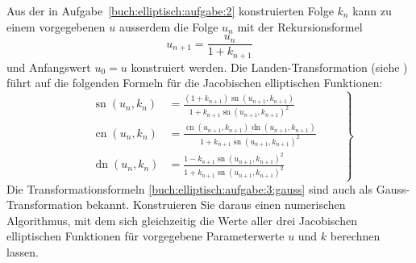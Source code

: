 \label{buch:elliptisch:aufgabe:3}%
Aus der in Aufgabe~\ref{buch:elliptisch:aufgabe:2} konstruierten Folge
$k_n$ kann zu einem vorgegebenen $u$ ausserdem die Folge $u_n$
mit der Rekursionsformel
\[
u_{n+1} = \frac{u_n}{1+k_{n+1}}
\]
und Anfangswert $u_0=u$ konstruiert werden.
Die Landen-Transformation (siehe \cite[80]{buch:ellfun-applications})
%
führt auf die folgenden Formeln für die Jacobischen elliptischen Funktionen:
\begin{equation}
\left.\qquad
\begin{aligned}
\operatorname{sn}(u_n,k_n)
&=
\frac{
(1+k_{n+1})\operatorname{sn}(u_{n+1},k_{n+1})
}{
1 + k_{n+1} \operatorname{sn}(u_{n+1},k_{n+1})^2
}
\\
\operatorname{cn}(u_n,k_n)
&=
\frac{
\operatorname{cn}(u_{n+1},k_{n+1})
\operatorname{dn}(u_{n+1},k_{n+1})
}{
1 + k_{n+1} \operatorname{sn}(u_{n+1},k_{n+1})^2
}
\\
\operatorname{dn}(u_n,k_n)
&=
\frac{
1 - k_{n+1} \operatorname{sn}(u_{n+1},k_{n+1})^2
}{
1 + k_{n+1} \operatorname{sn}(u_{n+1},k_{n+1})^2
}
\end{aligned}
\qquad\right\}
\label{buch:elliptisch:aufgabe:3:gauss}
\end{equation}
Die Transformationsformeln
\eqref{buch:elliptisch:aufgabe:3:gauss}
sind auch als Gauss-Transformation bekannt.
%
Konstruieren Sie daraus einen numerischen Algorithmus, mit dem sich
gleichzeitig die Werte aller drei Jacobischen elliptischen Funktionen
für vorgegebene Parameterwerte $u$ und $k$ berechnen lassen.

